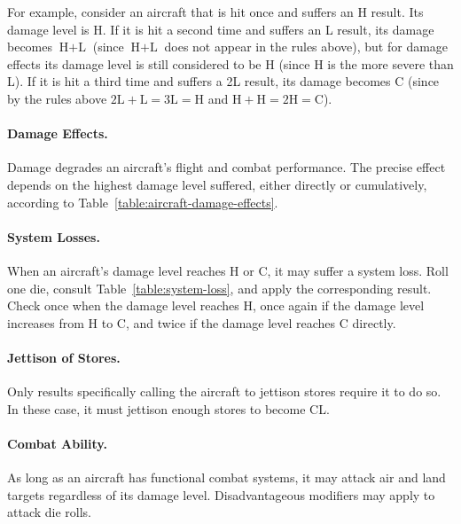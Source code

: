 {

For example, consider an aircraft that is hit once and suffers an H result. Its damage level is H. If it is hit a second time and suffers an L result, its damage becomes $\textrm{H}+\textrm{L}$ (since $\textrm{H}+\textrm{L}$ does not appear in the rules above), but for damage effects its damage level is still considered to be H (since H is the more severe than L). If it is hit a third time and suffers a 2L result, its damage becomes C (since by the rules above $2\textrm{L} + \textrm{L} = 3\textrm{L} = \textrm{H}$ and $\textrm{H} + \textrm{H} = 2\textrm{H} = \textrm{C}$).


\paragraph{Damage Effects.}
Damage degrades an aircraft's flight and combat performance. The precise effect depends on the highest damage level suffered, either directly or cumulatively, according to Table~\ref{table:aircraft-damage-effects}.



\paragraph{System Losses.}
When an aircraft's damage level reaches H or C, it may suffer a system loss. Roll one die, consult Table~\ref{table:system-loss}, and apply the corresponding result. Check once when the damage level reaches H, once again if the damage level increases from H to C, and twice if the damage level reaches C directly.

\paragraph{Jettison of Stores.} Only results specifically calling the aircraft to jettison stores require it to do so. In these case, it must jettison enough stores to become CL.

\paragraph{Combat Ability.} As long as an aircraft has functional combat systems, it may attack air and land targets regardless of its damage level. Disadvantageous modifiers may apply to attack die rolls.



}

